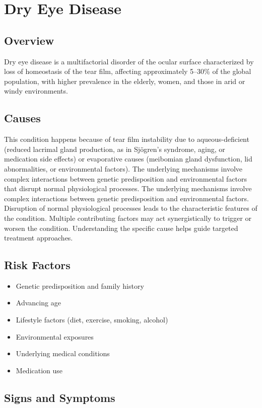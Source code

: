 \chapter{Dry Eye Disease}
\label{sec:Dry Eye Disease}

\section{Overview}
Dry eye disease is a multifactorial disorder of the ocular surface characterized by loss of homeostasis of the tear film, affecting approximately 5--30\% of the global population, with higher prevalence in the elderly, women, and those in arid or windy environments.
\section{Causes}
This condition happens because of tear film instability due to aqueous-deficient (reduced lacrimal gland production, as in Sj\"{o}gren's syndrome, aging, or medication side effects) or evaporative causes (meibomian gland dysfunction, lid abnormalities, or environmental factors). The underlying mechanisms involve complex interactions between genetic predisposition and environmental factors that disrupt normal physiological processes. The underlying mechanisms involve complex interactions between genetic predisposition and environmental factors. Disruption of normal physiological processes leads to the characteristic features of the condition. Multiple contributing factors may act synergistically to trigger or worsen the condition. Understanding the specific cause helps guide targeted treatment approaches.
\section{Risk Factors}


\begin{itemize}[noitemsep]
  \item Genetic predisposition and family history
  \item Advancing age
  \item Lifestyle factors (diet, exercise, smoking, alcohol)
  \item Environmental exposures
  \item Underlying medical conditions
  \item Medication use
\end{itemize}
\section{Signs and Symptoms}

